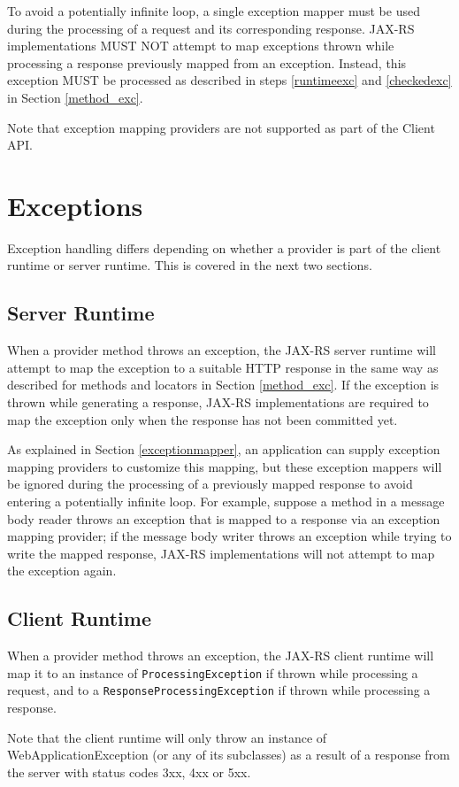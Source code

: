 To avoid a potentially infinite loop, a single exception mapper must be used during the processing of a request and its
corresponding response. JAX-RS implementations MUST NOT attempt to map exceptions thrown while processing a response
previously mapped from an exception. Instead, this exception MUST be processed as described in steps \ref{runtimeexc}
and \ref{checkedexc} in Section \ref{method_exc}.

Note that exception mapping providers are not supported as part of the Client API.

\section{Exceptions}
\label{exceptions_providers}

Exception handling differs depending on whether a provider is part of the client runtime or server runtime. This is
covered in the next two sections.

\subsection{Server Runtime}
\label{exceptions_providers_server}

When a provider method throws an exception, the JAX-RS server runtime will attempt to map the exception to a suitable
HTTP response in the same way as described for methods and locators in Section \ref{method_exc}. If the exception is
thrown while generating a response, JAX-RS implementations are required to map the exception only when the response has
not been committed yet.

As explained in Section \ref{exceptionmapper}, an application can supply exception mapping providers to customize this
mapping, but these exception mappers will be ignored during the processing of a previously mapped response to avoid
entering a potentially infinite loop. For example, suppose a method in a message body reader throws an exception that is
mapped to a response via an exception mapping provider; if the message body writer throws an exception while trying to
write the mapped response, JAX-RS implementations will not attempt to map the exception again.

\subsection{Client Runtime}
\label{exceptions_providers_client}

When a provider method throws an exception, the JAX-RS client runtime will map it to an instance of
\lstinline{ProcessingException} if thrown while processing a request, and to a \lstinline{ResponseProcessingException}
if thrown while processing a response.

Note that the client runtime will only throw an instance of WebApplicationException (or any of its subclasses) as a
result of a response from the server with status codes 3xx, 4xx or 5xx.
